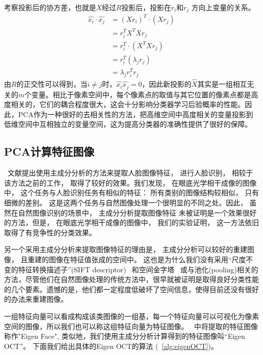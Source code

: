     考察投影后的协方差，也就是$X$经过$R$投影后，投影在$r_i$和$r_j$ 方向上变量的关系。
    \begin{equation}
    \begin{split}
        \hat{x_i} \cdot \hat{x_j} & = (Xr_i)^T \cdot (Xr_j) \\
        & = r_i^T X^T X r_j \\
        & = r_i^T\cdot(X^T X r_j) \\
        & = r_i^T(\lambda_j r_j) \\
        & = \lambda_j r_i^T r_j 
    \end{split}
    \end{equation}
    由$R$的正交性可以得到，当$i \ne j$时，$\hat{x_i} \hat{x_j} = 0$，因此新投影的$\hat{X}$其实是一组相互无关的$m$个变量。相比于像素空间中，每个像素点的取值与其它位置的像素点都是高度相关的，它们的耦合程度很大，这会十分影响分类器学习后验概率的性能。因此，PCA作为一种很好的去相关性的方法，把高维空间中高度相关的变量投影到低维空间中互相独立的变量空间，这为提高分类器的准确性提供了很好的保障。 
 
    
    \subsection{PCA计算特征图像}
        ~文献提出使用主成分分析的方法来提取人脸图像特征， 进行人脸识别， 相较于该方法之前的工作， 取得了较好的效果。我们发现， 在眼底光学相干成像的图像中， 这个任务与人脸识别任务有相似的特征： 所有类别的图像结构较相似， 只有细微的差别。 这是这两个任务与自然图像处理一个很明显的不同之处。因此， 虽然在自然图像识别的场景中， 主成分分析提取图像特征 未被证明是一个效果很好的方法，但是， 在眼底光学相干成像的图像中， 我们的实验证明， 这一方法依旧取得了有竞争性的分类效果。 

        另一个采用主成分分析来提取图像特征的理由是， 主成分分析可以较好的重建图像， 且重建的图像在特征值张成的空间中。  这也是为什么我们没有采用“尺度不变的特征转换描述子”(SIFT descriptor) ~\cite{yang2009linear}和空间金字塔~\cite{lazebnik2006beyond} 或与池化(pooling)相关的方法，尽管他们在自然图像处理的传统方法中，很早就被证明是取得良好分类性能的几个要素。遗憾的是，他们都一定程度低破坏了空间信息，使得目前还没有很好的办法来重建图像。

        一组特征向量可以看成构成该类图像的一组基，每一个特征向量可以可视化为像素空间的图像，所以我们也可以称这组特征向量为特征图像。~\cite{turk1991eigenfaces} 中将提取的特征图像称作"Eigen Face", 类似地，我们使用主成分分析计算得到的特征图像叫“Eigen OCT”。 下面我们给出具体的Eigen OCT的算法 (~\ref{alg:eigenOCT})。

